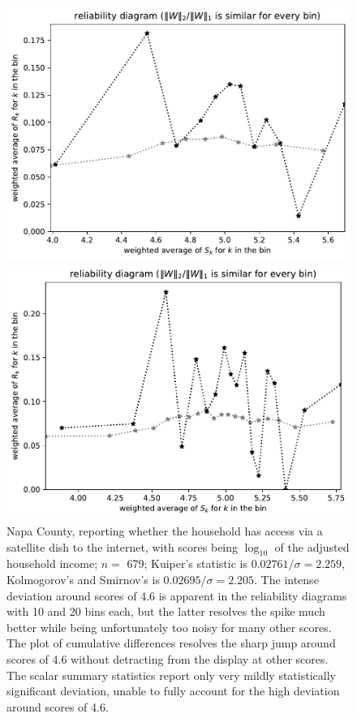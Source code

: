 \documentclass{article}
\begin{document}
\begin{figure}
\begin{centering}
\parbox{\imsize}{\includegraphics[width=\imsize]
{./codes/weighted/County_of_Napa-SATELLITE/equierrs10}}
\quad\quad
\parbox{\imsize}{\includegraphics[width=\imsize]
{./codes/weighted/County_of_Napa-SATELLITE/equierrs20}}

\end{centering}
\caption{Napa County, reporting whether the household has access
         via a satellite dish to the internet, with scores being $\log_{10}$
         of the adjusted household income;
         $n =$ 679; Kuiper's statistic is $0.02761 / \sigma = 2.259$,
         Kolmogorov's and Smirnov's is $0.02695 / \sigma = 2.205$.
The intense deviation around scores of 4.6 is apparent
in the reliability diagrams with 10 and 20 bins each,
but the latter resolves the spike much better while being unfortunately
too noisy for many other scores. The plot of cumulative differences
resolves the sharp jump around scores of 4.6 without detracting
from the display at other scores. The scalar summary statistics
report only very mildly statistically significant deviation,
unable to fully account for the high deviation around scores of 4.6.
}
\label{napa}
\end{figure}
\end{document}
